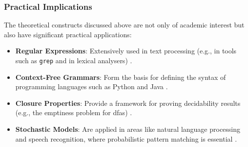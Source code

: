 \subsubsection{Practical Implications}
The theoretical constructs discussed above are not only of academic interest but also have significant practical applications:
\begin{itemize}
    \item \textbf{Regular Expressions}: Extensively used in text processing (e.g., in tools such as \texttt{grep} and in lexical analysers) \cite{kernighan1984unix, hopcroft2006introduction}.
    \item \textbf{Context-Free Grammars}: Form the basis for defining the syntax of programming languages such as Python and Java \cite{chomsky1956three, hopcroft2006introduction}.
    \item \textbf{Closure Properties}: Provide a framework for proving decidability results (e.g., the emptiness problem for \glspl{dfa}) \cite{hopcroft2006introduction}.
    \item \textbf{Stochastic Models}: Are applied in areas like natural language processing and speech recognition, where probabilistic pattern matching is essential \cite{rabin1963probabilistic}.
\end{itemize}